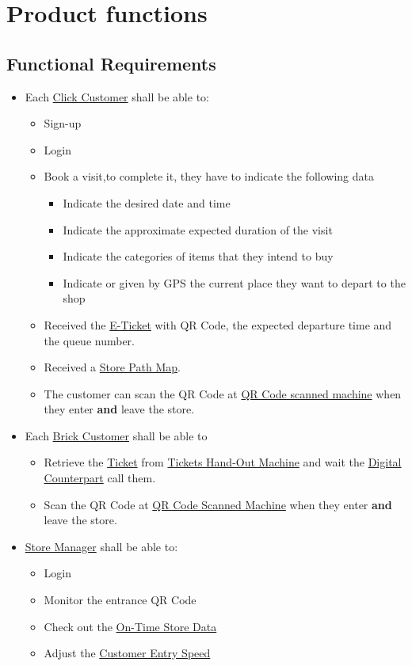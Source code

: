 \documentclass[a4paper,12pt]{book}
\begin{document}
\section{Product functions}
\subsection{Functional Requirements}
\begin{itemize}
	\item Each \hyperref[Definitions]{Click Customer} shall be able to: 
	\begin{itemize}
		\item Sign-up 
		\item Login
		\item Book a visit,to complete it, they have to indicate the following data
		\begin{itemize}
			\item Indicate the desired date and time
			\item Indicate the approximate expected duration of the visit
			\item Indicate the categories of items that they intend to buy
			\item Indicate or given by GPS the current place they want to depart to the shop
		\end{itemize}
		\item Received the \hyperref[Definitions]{E-Ticket} with QR Code, the expected departure time and the queue number.
		\item Received a \hyperref[Definitions]{Store Path Map}.	
		\item The customer can scan the QR Code at \hyperref[Definitions]{QR Code scanned machine} when they enter \textbf{and} leave the store.
	\end{itemize}

	\item Each \hyperref[Definitions]{Brick Customer} shall be able to
	\begin{itemize}
		\item Retrieve the \hyperref[Definitions]{Ticket} from \hyperref[Definitions]{Tickets Hand-Out Machine} and wait the \hyperref[Definitions]{Digital Counterpart} call them.
		\item Scan the QR Code at \hyperref[Definitions]{QR Code Scanned Machine} when they enter \textbf{and} leave the store.
	\end{itemize}

	\item \hyperref[Definitions]{Store Manager} shall be able to: 
	\begin{itemize}
		\item Login
		\item Monitor the entrance QR Code
		\item Check out the \hyperref[Definitions]{On-Time Store Data}
		\item Adjust the \hyperref[Definitions]{Customer Entry Speed}
	\end{itemize}


\end{itemize}
\end{document}
